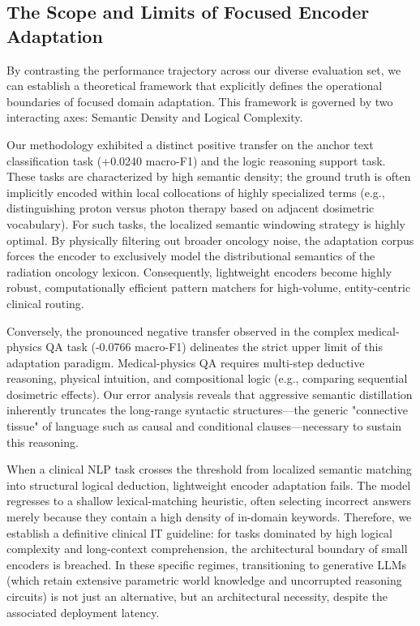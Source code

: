 \documentclass[a4paper,fleqn]{cas-dc}
\begin{document}
\iffalse
\subsection{The Scope and Limits of Focused Encoder Adaptation}
By contrasting the performance trajectory across our diverse evaluation set, we can establish a theoretical framework that explicitly defines the operational boundaries of focused domain adaptation. This framework is governed by two interacting axes: Semantic Density and Logical Complexity.

Our methodology exhibited a distinct positive transfer on the anchor text classification task (+0.0240 macro-F1) and the logic reasoning support task. These tasks are characterized by high semantic density; the ground truth is often implicitly encoded within local collocations of highly specialized terms (e.g., distinguishing proton versus photon therapy based on adjacent dosimetric vocabulary). For such tasks, the localized semantic windowing strategy is highly optimal. By physically filtering out broader oncology noise, the adaptation corpus forces the encoder to exclusively model the distributional semantics of the radiation oncology lexicon. Consequently, lightweight encoders become highly robust, computationally efficient pattern matchers for high-volume, entity-centric clinical routing.

Conversely, the pronounced negative transfer observed in the complex medical-physics QA task (-0.0766 macro-F1) delineates the strict upper limit of this adaptation paradigm. Medical-physics QA requires multi-step deductive reasoning, physical intuition, and compositional logic (e.g., comparing sequential dosimetric effects). Our error analysis reveals that aggressive semantic distillation inherently truncates the long-range syntactic structures—the generic "connective tissue" of language such as causal and conditional clauses—necessary to sustain this reasoning.

When a clinical NLP task crosses the threshold from localized semantic matching into structural logical deduction, lightweight encoder adaptation fails. The model regresses to a shallow lexical-matching heuristic, often selecting incorrect answers merely because they contain a high density of in-domain keywords. Therefore, we establish a definitive clinical IT guideline: for tasks dominated by high logical complexity and long-context comprehension, the architectural boundary of small encoders is breached. In these specific regimes, transitioning to generative LLMs (which retain extensive parametric world knowledge and uncorrupted reasoning circuits) is not just an alternative, but an architectural necessity, despite the associated deployment latency.
\end{document}
